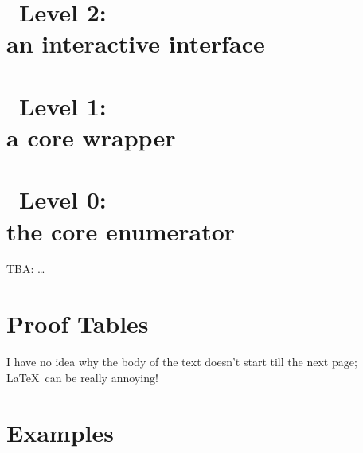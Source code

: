 \documentclass[12pt,a4paper,twoside]{report}
\begin{document}

\chapter{\ace\ Level 2: \\ an interactive interface}



\chapter{\ace\ Level 1: \\ a core wrapper}



\chapter{\ace\ Level 0: \\ the core enumerator}
%

TBA: \dots


\chapter{Proof Tables}

I have no idea why the body of the text doesn't start till the next page;
  \LaTeX\ can be really annoying!



% 
% 


\clearpage
\appendix

\chapter{Examples}\label{app:ex}



\clearpage




\end{document}
